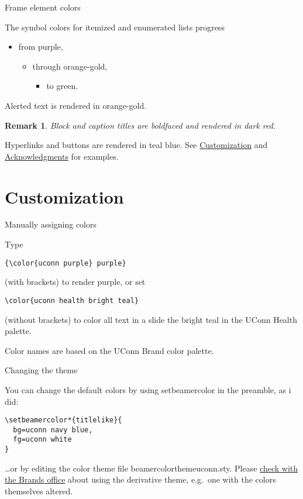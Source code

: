 \documentclass{beamer}
\newtheorem{remark}{Remark}
\begin{document}
\begin{frame}{Frame element colors}

The symbol colors for itemized and enumerated lists progress
\begin{itemize}
\item from purple,
\begin{itemize}
\item through orange-gold,
\begin{itemize}
\item to green.
\end{itemize}
\end{itemize}
\end{itemize}
\alert{Alerted text is rendered in orange-gold.}

\vfill\begin{remark}
Block and caption titles are boldfaced and rendered in dark red.
\end{remark}

\vfill
Hyperlinks and buttons are rendered in teal blue.
See \hyperlink{sec:customization}{Customization} and \hyperlink{slide:acknowledgments}{Acknowledgments} for examples.

\end{frame}


\section{Customization}
\label{sec:customization}


\begin{frame}[fragile]{Manually assigning colors}

Type
\begin{verbatim}
{\color{uconn purple} purple}
\end{verbatim}
(with brackets) to render {\color{uconn purple} purple}, or set
\begin{verbatim}
\color{uconn health bright teal}
\end{verbatim}
\color{uconn health bright teal}
(without brackets) to color all text in a slide the bright teal in the UConn Health palette.

\color{black}\vfill
Color names are based on the UConn Brand color palette.

\center\href{http://brand.uconn.edu/standards/color-palette/}{}

\end{frame}


\begin{frame}[fragile]{Changing the theme}

You can change the default colors by using setbeamercolor in the preamble, as i did:
\begin{verbatim}
\setbeamercolor*{titlelike}{
  bg=uconn navy blue,
  fg=uconn white
}
\end{verbatim}
\ldots or by editing the color theme file {\ttfamily beamercolorthemeuconn.sty}.
Please \hyperlink{mailto:brand@uconn.edu}{check with the Brands office} about using the derivative theme, e.g.\ one with the colors themselves altered.

\end{frame}
\end{document}
